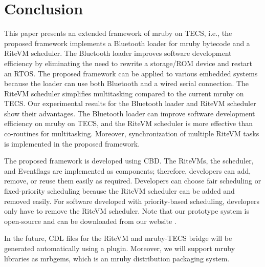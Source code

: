 \documentclass[conference]{IEEEtran/IEEEtran/IEEEtran}
\begin{document}
 
\section{Conclusion}
\label{sec:Conclusion}
This paper presents an extended framework of mruby on TECS, i.e., the proposed framework implements a Bluetooth loader for mruby bytecode and a RiteVM scheduler.
The Bluetooth loader improves software development efficiency by eliminating the need to rewrite a storage/ROM device and restart an RTOS.
The proposed framework can be applied to various embedded systems because the loader can use both Bluetooth and a wired serial connection.
The RiteVM scheduler simplifies multitasking compared to the current mruby on TECS.
Our experimental results for the Bluetooth loader and RiteVM scheduler show their advantages.
The Bluetooth loader can improve software development efficiency on mruby on TECS, and the RiteVM scheduler is more effective than co-routines for multitasking.
Moreover, synchronization of multiple RiteVM tasks is implemented in the proposed framework.

The proposed framework is developed using CBD.
The RiteVMs, the scheduler, and Eventflags are implemented as components; therefore, developers can add, remove, or reuse them easily as required.
Developers can choose fair scheduling or fixed-priority scheduling because the RiteVM scheduler can be added and removed easily.
For software developed with priority-based scheduling, developers only have to remove the RiteVM scheduler.
Note that our prototype system is open-source and can be downloaded from our website \cite{url:download}.

In the future, CDL files for the RiteVM and mruby-TECS bridge will be generated automatically using a plugin.
Moreover, we will support mruby libraries as mrbgems, which is an mruby distribution packaging system.



\end{document}
